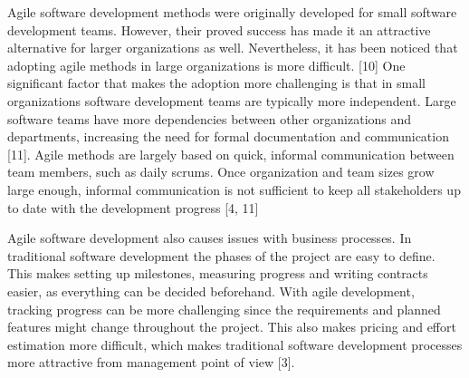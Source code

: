 Agile software development methods were originally developed for small
software development teams. However, their proved success has made it an
attractive alternative for larger organizations as well. Nevertheless,
it has been noticed that adopting agile methods in large organizations
is more difficult. [10] One significant factor
that makes the adoption more challenging is that in small organizations
software development teams are typically more independent. Large
software teams have more dependencies between other organizations
and departments, increasing the need for formal documentation and
communication [11]. Agile methods are largely based
on quick, informal communication between team members, such as daily
scrums. Once organization and team sizes grow large enough, informal
communication is not sufficient to keep all stakeholders up to date with
the development progress [4, 11]

Agile software development also causes issues with business processes.
In traditional software development the phases of the project are easy
to define. This makes setting up milestones, measuring progress and
writing contracts easier, as everything can be decided beforehand. With
agile development, tracking progress can be more challenging since the
requirements and planned features might change throughout the project.
This also makes pricing and effort estimation more difficult, which
makes traditional software development processes more attractive from
management point of view [3].
